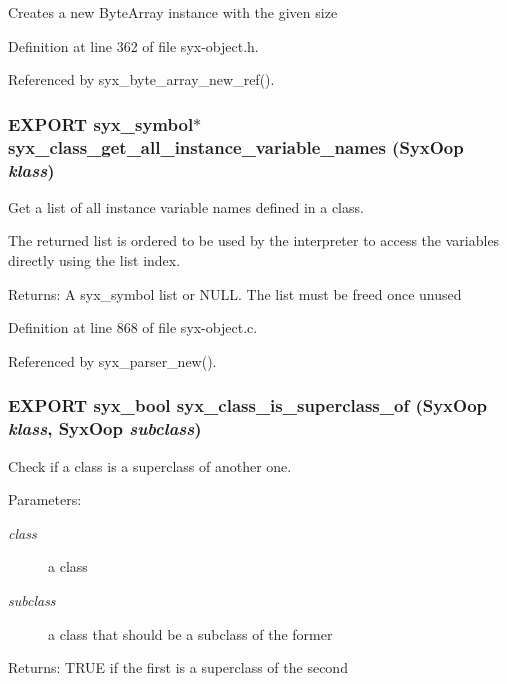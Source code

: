 Creates a new ByteArray instance with the given size 

Definition at line 362 of file syx-object.h.

Referenced by syx\_\-byte\_\-array\_\-new\_\-ref().\hypertarget{syx-object_8h_9023e67e65ca397b1fb0a54e71879d0f}{
\subsubsection{\setlength{\rightskip}{0pt plus 5cm}EXPORT {\bf syx\_\-symbol}$\ast$ syx\_\-class\_\-get\_\-all\_\-instance\_\-variable\_\-names ({\bf SyxOop} {\em klass})}}
\label{syx-object_8h_9023e67e65ca397b1fb0a54e71879d0f}


Get a list of all instance variable names defined in a class.

The returned list is ordered to be used by the interpreter to access the variables directly using the list index.

\begin{Desc}
\item[Returns:]A syx\_\-symbol list or NULL. The list must be freed once unused \end{Desc}


Definition at line 868 of file syx-object.c.

Referenced by syx\_\-parser\_\-new().\hypertarget{syx-object_8h_3c39f91fa6304f6180cdb9888990ab75}{
\subsubsection{\setlength{\rightskip}{0pt plus 5cm}EXPORT {\bf syx\_\-bool} syx\_\-class\_\-is\_\-superclass\_\-of ({\bf SyxOop} {\em klass}, \/  {\bf SyxOop} {\em subclass})}}
\label{syx-object_8h_3c39f91fa6304f6180cdb9888990ab75}


Check if a class is a superclass of another one.

\begin{Desc}
\item[Parameters:]
\begin{description}
\item[{\em class}]a class \item[{\em subclass}]a class that should be a subclass of the former \end{description}
\end{Desc}
\begin{Desc}
\item[Returns:]TRUE if the first is a superclass of the second \end{Desc}


